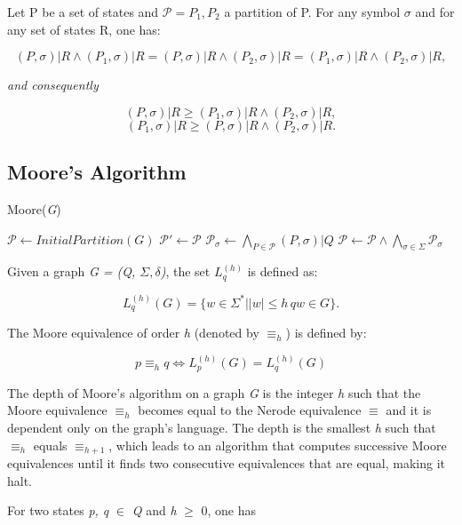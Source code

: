 {\begin{lemma}\label{lemm:hopcrof}
Let P be a set of states and $\mathcal{P} = {P_1, P_2}$ a partition of P. For any symbol $\sigma$ and for any set of states R, one has:
\end{lemma}
 

\[
(P,\sigma)|R \wedge (P_1, \sigma)|R = (P, \sigma)|R \wedge (P_2, \sigma)|R = (P_1,\sigma)|R \wedge (P_2,\sigma)|R,
\]

\textit{and consequently}

\[
(P,\sigma)|R \geqslant (P_1,\sigma)|R \wedge (P_2,\sigma)|R,
\]
\[
(P_1,\sigma)|R \geqslant (P,\sigma)|R \wedge (P_2,\sigma)|R.
\]
\subsection{Moore's Algorithm}

\begin{algorithm} 
  \caption{Moore(\textit{G})\label{alg:moore}}
    \begin{algorithmic}[1]
      \State $\mathcal{P} \leftarrow InitialPartition(G)$
      \Repeat
      	\State $\mathcal{P}' \leftarrow \mathcal{P}$
      	\ForAll{$\sigma \in \Sigma$}
      		\State $\mathcal{P}_{\sigma} \leftarrow \bigwedge_{P\in \mathcal{P}}(P,\sigma)|Q$
      	\EndFor
      	\State $\mathcal{P} \leftarrow \mathcal{P}\wedge\bigwedge_{\sigma\in\Sigma}\mathcal{P}_{\sigma}$
    \end{algorithmic}
  \end{algorithm}
 
Given a graph \textit{G = (Q, $\Sigma, \delta$)}, the set $L_q^{(h)}$ is defined as:

\[
L_q^{(h)}(G) = \{w \in \Sigma^* | |w| \leq h\, qw \in G\}.
\]

The Moore equivalence of order \textit{h} (denoted by $\equiv_h$) is defined by:

\[
p \equiv_h q \Leftrightarrow L_p^{(h)}(G) = L_q^{(h)}(G)
\]

The depth of Moore's algorithm on a graph \textit{G} is the integer \textit{h} such that the Moore equivalence $\equiv_h$ becomes equal to the Nerode equivalence $\equiv$ and it is dependent only on the graph's language. The depth is the smallest \textit{h} such that $\equiv_h$ equals $\equiv_{h+1}$, which leads to an algorithm that computes successive Moore equivalences until it finds two consecutive equivalences that are equal, making it halt.

\begin{proposition}\label{prop:makemooreeasy}
For two states \textit{p, q} $\in$ \textit{Q} and \textit{h} $\geq$ 0, one has


\end{proposition}}

